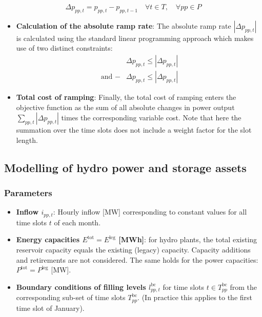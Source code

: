 \documentclass[]{article}
\begin{document}
\[
\Delta p_{pp,t} = p_{pp,t} - p_{pp,t-1}\quad\forall t\in T,\quad\forall pp\in P
\]

\begin{itemize}
\item
  \textbf{Calculation of the absolute ramp rate}: The absolute ramp rate
  $\left|\Delta p_{pp,t}\right|$ is calculated using the standard linear
  programming approach which makes use of two distinct constraints:
  \[\begin{aligned}
  & \Delta p_{pp,t}\leqslant \left|\Delta p_{pp,t}\right|\\
  \text{and }-&\Delta p_{pp,t}\leqslant \left|\Delta p_{pp,t}\right|
  \end{aligned}\]
\item
  \textbf{Total cost of ramping}: Finally, the total cost of ramping enters the objective function as the sum of all absolute changes in power output $\sum_{pp,t} \left|\Delta p_{pp,t}\right|$ times the corresponding variable cost. Note that here the summation over the time slots does not include a weight factor for the slot length.
\end{itemize}

\subsection{Modelling of hydro power and storage
assets}\label{modelling-of-hydro-power-and-storage-assets}

\subsubsection{Parameters}\label{defining-parameters}

\begin{itemize}
\itemsep1pt\parskip0pt
\item
  \textbf{Inflow $i_{pp,t}$}: Hourly inflow {[}MW{]} corresponding to
  constant values for all time slots $t$ of each month.
\item
  \textbf{Energy capacities $E^\mathrm{tot} = E^\mathrm{leg}$
  [MWh]}: for hydro plants, the total existing reservoir capacity
  equals the existing (legacy) capacity. Capacity additions and
  retirements are not considered. The same holds for the power
  capacities: $P^\mathrm{tot} = P^\mathrm{leg}$ {[}MW{]}.
\item
  \textbf{Boundary conditions of filling levels $l^\mathrm{bc}_{pp,t}$}
  for time slots $t\in T^\mathrm{bc}_{pp}$ from the corresponding
  sub-set of time slots $T^\mathrm{bc}_{pp}$. (In practice this applies
  to the first time slot of January).
\end{itemize}
\end{document}
